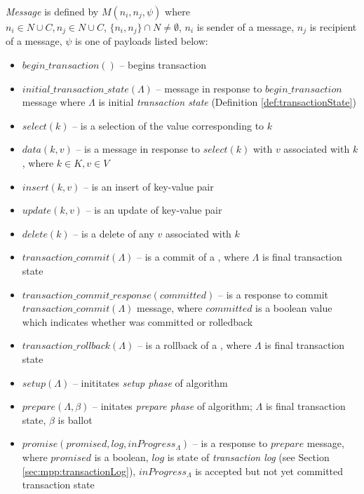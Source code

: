 \begin{definition}
	\label{def:message}
	\emph{Message} is defined by $\mathit{M}(n_{i}, n_{j}, \psi)$ where 
	\\ $n_{i}\in\mathit{N}\cup\mathit{C}, n_{j}\in\mathit{N}\cup\mathit{C}$, $\{n_{i}, n_{j}\}\cap\mathit{N}\neq\emptyset$, $n_{i}$ is sender of a message, $n_{j}$ is recipient of a message, $\psi$ is one of payloads listed below:
	\begin{itemize}	
	\item $\mathit{begin\_transaction}()$ -- begins transaction \transaction 
	\item $\mathit{initial\_transaction\_state}(\Lambda)$ -- message in response to $\mathit{begin\_transaction}$ message where $\Lambda$ is initial \emph{transaction state} (Definition \ref{def:transactionState}) 
	\item $\mathit{select(k)}$ -- is a selection of the value corresponding to $k$ 
	\item $\mathit{data(k,v)}$ -- is a message in response to $\mathit{select(k)}$ with $v$ associated with $k$, where $k\in\mathit{K}, v\in\mathit{V}$ 
	\item $\mathit{insert(k,v)}$ -- is an insert of key-value pair 
	\item $\mathit{update(k,v)}$ -- is an update of key-value pair 
	\item $\mathit{delete(k)}$ -- is a delete of any $v$ associated with $k$
	\item $\mathit{transaction\_commit}(\Lambda)$ -- is a commit of a \transaction, where $\Lambda$ is final transaction state 
	\item $\mathit{transaction\_commit\_response}(committed)$ -- is a response to commit $\mathit{transaction\_commit}(\Lambda)$ message, where $committed$ is a boolean value which indicates whether \transaction was committed or rolledback
	\item $\mathit{transaction\_rollback}(\Lambda)$ -- is a rollback of a \transaction, where $\Lambda$ is final transaction state 
	\item $\mathit{setup}(\Lambda)$ -- inititates \emph{setup phase} of \mpt algorithm 
	\item $\mathit{prepare}(\Lambda, \beta)$ -- initates \emph{prepare phase} of \mpt algorithm; $\Lambda$ is final transaction state, $\beta$ is \paxos ballot 
	\item $\mathit{promise(promised, log, inProgress_{\Lambda})}$ -- is a response to $\mathit{prepare}$ message, where $\mathit{promised}$ is a boolean, $\mathit{log}$ is state of \emph{transaction log} (see Section \ref{sec:mpp:transactionLog}), $\mathit{inProgress_{\Lambda}}$ is accepted but not yet committed transaction state 

\end{itemize}
\end{definition}
